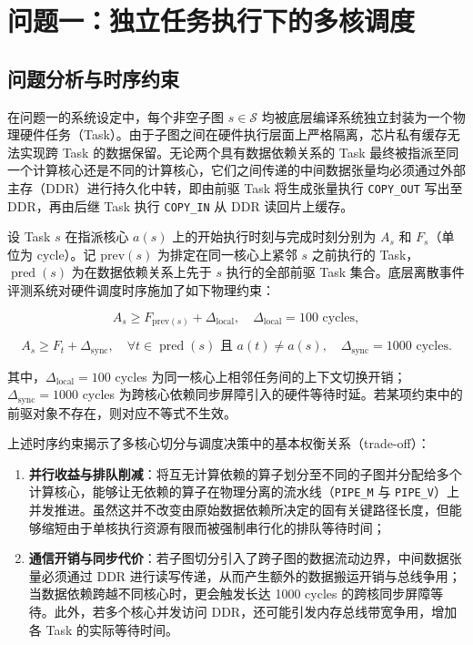 \documentclass[anonymous,withtoc]{gmcm2026}
\providecommand{\tightlist}{\setlength{\itemsep}{0pt}\setlength{\parskip}{0pt}}
\begin{document}
\section{问题一：独立任务执行下的多核调度}

\subsection{问题分析与时序约束}

在问题一的系统设定中，每个非空子图 \(s \in \mathcal{S}\) 均被底层编译系统独立封装为一个物理硬件任务（Task）。由于子图之间在硬件执行层面上严格隔离，芯片私有缓存无法实现跨 Task 的数据保留。无论两个具有数据依赖关系的 Task 最终被指派至同一个计算核心还是不同的计算核心，它们之间传递的中间数据张量均必须通过外部主存（DDR）进行持久化中转，即由前驱 Task 将生成张量执行 \texttt{COPY\_OUT} 写出至 DDR，再由后继 Task 执行 \texttt{COPY\_IN} 从 DDR 读回片上缓存。

设 Task \(s\) 在指派核心 \(a(s)\) 上的开始执行时刻与完成时刻分别为 \(A_s\) 和 \(F_s\)（单位为 cycle）。记 \(\mathrm{prev}(s)\) 为排定在同一核心上紧邻 \(s\) 之前执行的 Task，\(\operatorname{pred}(s)\) 为在数据依赖关系上先于 \(s\) 执行的全部前驱 Task 集合。底层离散事件评测系统对硬件调度时序施加了如下物理约束：

\begin{equation}
A_s \ge F_{\mathrm{prev}(s)} + \Delta_{\mathrm{local}}, \quad \Delta_{\mathrm{local}} = 100 \text{ cycles},
\end{equation}

\begin{equation}
A_s \ge F_t + \Delta_{\mathrm{sync}}, \quad \forall t \in \operatorname{pred}(s) \text{ 且 } a(t) \ne a(s), \quad \Delta_{\mathrm{sync}} = 1000 \text{ cycles}.
\end{equation}

其中，\(\Delta_{\mathrm{local}} = 100\) cycles 为同一核心上相邻任务间的上下文切换开销；\(\Delta_{\mathrm{sync}} = 1000\) cycles 为跨核心依赖同步屏障引入的硬件等待时延。若某项约束中的前驱对象不存在，则对应不等式不生效。

上述时序约束揭示了多核心切分与调度决策中的基本权衡关系（trade-off）：

\begin{enumerate}
\def\labelenumi{\arabic{enumi}.}
\tightlist
\item
  \textbf{并行收益与排队削减}：将互无计算依赖的算子划分至不同的子图并分配给多个计算核心，能够让无依赖的算子在物理分离的流水线（\texttt{PIPE\_M} 与 \texttt{PIPE\_V}）上并发推进。虽然这并不改变由原始数据依赖所决定的固有关键路径长度，但能够缩短由于单核执行资源有限而被强制串行化的排队等待时间；
\item
  \textbf{通信开销与同步代价}：若子图切分引入了跨子图的数据流动边界，中间数据张量必须通过 DDR 进行读写传递，从而产生额外的数据搬运开销与总线争用；当数据依赖跨越不同核心时，更会触发长达 1000 cycles 的跨核同步屏障等待。此外，若多个核心并发访问 DDR，还可能引发内存总线带宽争用，增加各 Task 的实际等待时间。
\end{enumerate}
\end{document}
